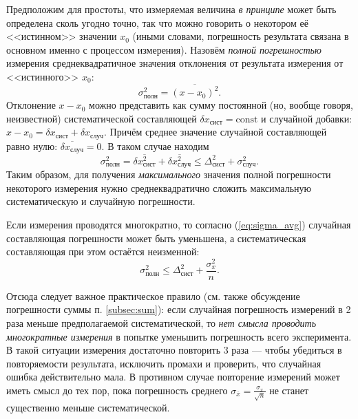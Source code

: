 Предположим для простоты, что измеряемая величина \emph{в принципе}
может быть определена сколь угодно точно, так что можно говорить о
некотором её <<истинном>> значении $x_{0}$
(иными словами, погрешность результата связана в основном именно с
процессом измерения). Назовём \emph{полной погрешностью} измерения
среднеквадратичное значения отклонения от результата измерения от
<<истинного>> $x_{0}$: 
\[
\sigma_{\text{полн}}^{2}=\overline{\left(x-x_{0}\right)^{2}}.
\]
Отклонение $x-x_{0}$ можно представить как сумму постоянной (но,
вообще говоря, неизвестной) систематической составляющей $\delta x_{\text{сист}}=\mathrm{const}$
и случайной добавки: $x-x_{0}=\delta x_{\text{сист}}+\delta x_{\text{случ}}$.
Причём среднее значение случайной составляющей равно нулю: $\overline{\delta x_{\text{случ}}}=0$.
В таком случае находим
\begin{equation}
\sigma_{\text{полн}}^{2}=\overline{\delta x_{\text{сист}}^{2}}+\overline{\delta x_{\text{случ}}^{2}}\le\Delta_{\text{сист}}^{2}+\sigma_{\text{случ}}^{2}.\label{eq:syst_full}
\end{equation}
Таким образом, для получения \emph{максимального} значения полной
погрешности некоторого измерения нужно среднеквадратично сложить максимальную
систематическую и случайную погрешности.

Если измерения проводятся многократно, то согласно (\ref{eq:sigma_avg})
случайная составляющая погрешности может быть уменьшена, а систематическая
составляющая при этом остаётся неизменной:
\[
\sigma_{\text{полн}}^{2}\le\Delta_{\text{сист}}^{2}+\frac{\sigma_{x}^{2}}{n}.
\]

Отсюда следует важное практическое правило (см. также обсуждение погрешности
суммы п. \ref{subsec:sum}): если случайная погрешность измерений
в 2 раза меньше предполагаемой систематической, то \emph{нет
смысла проводить многократные измерения} в попытке уменьшить погрешность
всего эксперимента. В такой ситуации измерения достаточно повторить
3 раза --- чтобы убедиться в повторяемости
результата, исключить промахи и проверить, что случайная ошибка действительно
мала. В противном случае повторение измерений может иметь смысл до
тех пор, пока погрешность среднего $\sigma_{\overline{x}}=\frac{\sigma_{x}}{\sqrt{n}}$
не станет существенно меньше систематической.

